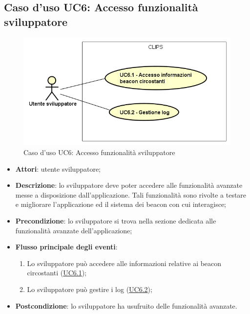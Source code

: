 \documentclass[../AnalisiDeiRequisiti.tex]{subfiles}
\begin{document}
\subsection{Caso d'uso UC6: Accesso funzionalità sviluppatore}

        \begin{figure}[H]
            \centering
            \includegraphics[scale=0.95, width=\textwidth]{img/UC6.png}
            \caption{Caso d'uso UC6: Accesso funzionalità sviluppatore}\label{fig:UC6} 
        \end{figure}
\begin{itemize}
\item \textbf{Attori}: utente sviluppatore;
\item \textbf{Descrizione}: lo sviluppatore deve poter accedere alle funzionalità avanzate messe a disposizione dall'applicazione. Tali funzionalità sono rivolte a testare e migliorare l'applicazione ed il sistema dei beacon con cui interagisce; 
      \item \textbf{Precondizione}: lo sviluppatore si trova nella sezione dedicata alle funzionalità avanzate dell'applicazione;

        \item \textbf{Flusso principale degli eventi}:
          \begin{enumerate}
          \item Lo sviluppatore può accedere alle informazioni relative ai beacon circostanti (\hyperlink{UC6.1}{UC6.1});
          \item Lo sviluppatore può gestire i log (\hyperlink{UC6.2}{UC6.2});

      \end{enumerate}
    \item \textbf{Postcondizione}: lo sviluppatore ha usufruito delle funzionalità avanzate.
  \end{itemize}
\hypertarget{UC6.1}{}
\end{document}
